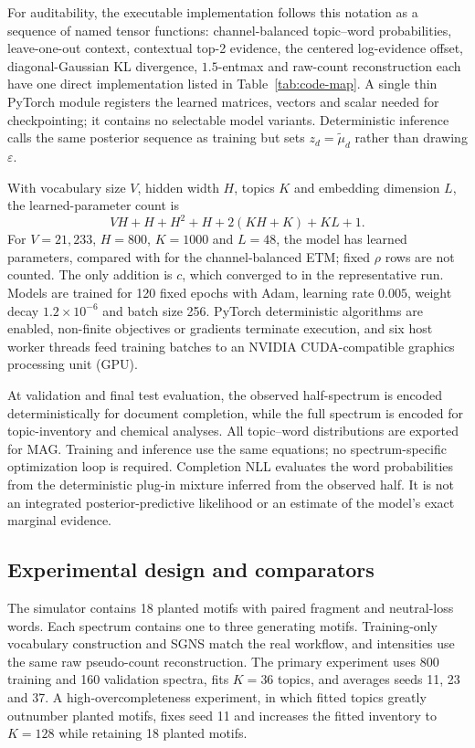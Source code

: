 \documentclass[10pt,a4paper]{article}
\begin{document}
For auditability, the executable implementation follows this notation as a
sequence of named tensor functions: channel-balanced topic--word probabilities,
leave-one-out context, contextual top-2 evidence, the centered log-evidence
offset, diagonal-Gaussian KL divergence, $1.5$-entmax and raw-count
reconstruction each have one direct implementation listed in
Table~\ref{tab:code-map}. A single thin PyTorch
module registers the learned matrices, vectors and scalar needed for
checkpointing; it contains no selectable model variants. Deterministic
inference calls the same posterior sequence as training but sets
$z_d=\widetilde\mu_d$ rather than drawing $\varepsilon$.

With vocabulary size $V$, hidden width $H$, topics $K$ and embedding dimension
$L$, the learned-parameter count is
\[
  VH+H+H^2+H+2(KH+K)+KL+1.
\]
For $V=21{,}233$, $H=800$, $K=1000$ and $L=48$, the model has
\ContextualParameters{} learned parameters, compared with \BaseParameters{}
for the channel-balanced ETM; fixed $\rho$ rows are not counted. The only
addition is $c$, which converged to \LearnedContextScale{} in the representative
run. Models are
trained for 120 fixed epochs with Adam, learning rate $0.005$, weight decay
$1.2\times10^{-6}$ and batch size 256. PyTorch deterministic algorithms are
enabled, non-finite objectives or gradients terminate execution, and six
host worker threads feed training batches to an NVIDIA CUDA-compatible
graphics processing unit (GPU).

At validation and final test evaluation, the observed half-spectrum is encoded
deterministically for document completion, while the full spectrum is encoded
for topic-inventory and chemical analyses. All \StudyTopics{} topic--word
distributions are exported for MAG. Training and inference use the same
equations; no spectrum-specific optimization loop is required.
Completion NLL evaluates the word probabilities from the deterministic
plug-in mixture inferred from the observed half. It is not an integrated
posterior-predictive likelihood or an estimate of the model's exact marginal
evidence.

\subsection{Experimental design and comparators}

The simulator contains 18 planted motifs with paired fragment and neutral-loss
words. Each spectrum contains one to three generating motifs. Training-only
vocabulary construction and SGNS match the real workflow, and intensities use
the same raw pseudo-count reconstruction. The primary experiment uses 800
training and 160 validation spectra, fits $K=36$ topics, and averages seeds 11,
23 and 37. A high-overcompleteness experiment, in which fitted topics greatly
outnumber planted motifs, fixes seed 11 and increases the fitted inventory to
$K=128$ while retaining 18 planted motifs.
\end{document}
